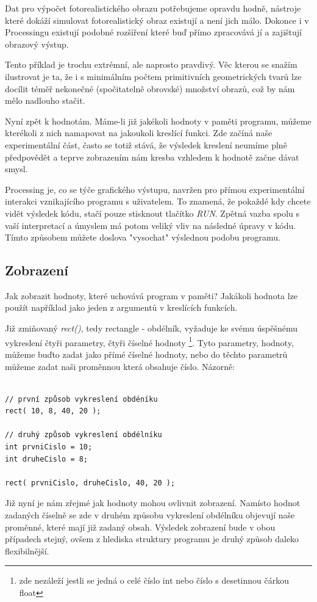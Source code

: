 \documentclass[11pt]{book}
\newcommand{\pododdil}[1]{\subsection{#1}\label{subsec:#1}}
\newcommand{\vyraz}[1]{\textit{\gls{#1}}\index{#1}}
\begin{document}
Dat pro výpočet fotorealistického obrazu potřebujeme opravdu hodně, nástroje které dokáží simulovat fotorealistický obraz existují a není jich málo. Dokonce i v Processingu existují podobné rozšíření které buď přímo zpracovává jí a zajištují obrazový výstup.

Tento příklad je trochu extrémní, ale naprosto pravdivý. Věc kterou se snažím ilustrovat je ta, že i s minimálním počtem primitivních geometrických tvarů lze docílit téměř nekonečné (spočitatelně obrovské) množství obrazů, což by nám mělo nadlouho stačit.

Nyní zpět k hodnotám. Máme-li již jakékoli hodnoty v paměti programu, můžeme kterékoli z nich namapovat na jakoukoli kreslící funkci. Zde začíná naše experimentální část, často se totiž stává, že výsledek kreslení neumíme plně předpovědět a teprve zobrazením nám kresba vzhledem k hodnotě začne dávat smysl.

Processing je, co se týče grafického výstupu, navržen pro přímou experimentální interakci vznikajícího programu s uživatelem. To znamená, že pokaždé kdy chcete vidět výsledek kódu, stačí pouze stisknout tlačítko {\em RUN}. Zpětná vazba spolu s vaší interpretací a úmyslem má potom veliký vliv na následné úpravy v kódu. Tímto způsobem můžete doslova "vysochat" výslednou podobu programu.

\pododdil{Zobrazení}

Jak zobrazit hodnoty, které uchovává program v paměti? Jakákoli hodnota lze použít například jako jeden z argumentů v kreslících funkcích.

Již zmiňovaný \vyraz{rect()}, tedy rectangle - obdélník, vyžaduje ke svému úspěšnému vykreslení čtyři parametry, čtyři číselné hodnoty \footnote{zde nezáleží jestli se jedná o celé číslo int nebo číslo s desetinnou čárkou float}. Tyto parametry, hodnoty, můžeme buďto zadat jako přímé číselné hodnoty, nebo do těchto parametrů můžeme zadat naši proměnnou která obsahuje číslo. Názorně:

\begin{lstlisting}

// první způsob vykreslení obdéníku
rect( 10, 8, 40, 20 );

// druhý způsob vykreslení obdélníku
int prvniCislo = 10;
int druheCislo = 8;

rect( prvniCislo, druheCislo, 40, 20 );

\end{lstlisting}

Již nyní je nám zřejmé jak hodnoty mohou ovlivnit zobrazení. Namísto hodnot zadaných číselně se zde v druhém způsobu vykreslení obdélníku objevují naše proměnné, které mají již zadaný obsah. Výsledek zobrazení bude v obou případech stejný, ovšem z hlediska struktury programu je druhý způsob daleko flexibilnější.
\end{document}
